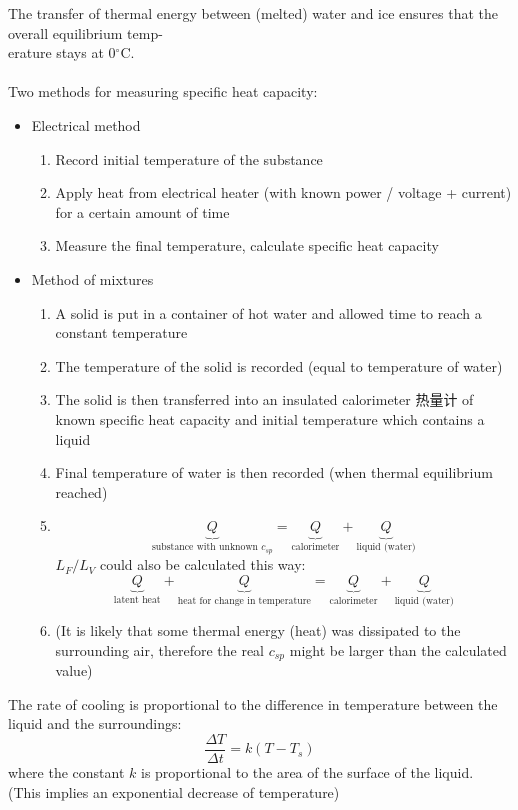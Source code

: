 \documentclass[a4paper,12pt]{article}
\begin{document}
The transfer of thermal energy between (melted) water and ice ensures that the overall equilibrium temp-\\erature stays at 0$^\circ$C.\\\\
Two methods for measuring specific heat capacity:
\begin{itemize}
  \item Electrical method
  \begin{enumerate}
    \item Record initial temperature of the substance
    \item Apply heat from electrical heater (with known power / voltage + current) for a certain amount of time
    \item Measure the final temperature, calculate specific heat capacity
  \end{enumerate}
  \item Method of mixtures
  \begin{enumerate}
    \item A solid is put in a container of hot water and allowed time to reach a constant temperature
    \item The temperature of the solid is recorded (equal to temperature of water)
    \item The solid is then transferred into an insulated calorimeter 热量计 of known specific heat capacity and initial temperature which contains a liquid
    \item Final temperature of water is then recorded (when thermal equilibrium reached)
    \item \[\underbrace{Q}_\text{substance with unknown $c_{sp}$}=\underbrace{Q}_\text{calorimeter}+\underbrace{Q}_\text{liquid (water)}\]
    $L_F / L_V$ could also be calculated this way:
    \[\underbrace{Q}_\text{latent heat} + \underbrace{Q}_\text{heat for change in temperature}=\underbrace{Q}_\text{calorimeter}+\underbrace{Q}_\text{liquid (water)}\]
    \item (It is likely that some thermal energy (heat) was dissipated to the surrounding air, therefore the real $c_{sp}$ might be larger than the calculated value)
  \end{enumerate}
\end{itemize}
The rate of cooling is proportional to the difference in temperature between the liquid and the surroundings:
\[\dfrac{\Delta T}{\Delta t}=k(T-T_s)\]
where the constant $k$ is proportional to the area of the surface of the liquid.\\
(This implies an exponential decrease of temperature)
\end{document}

